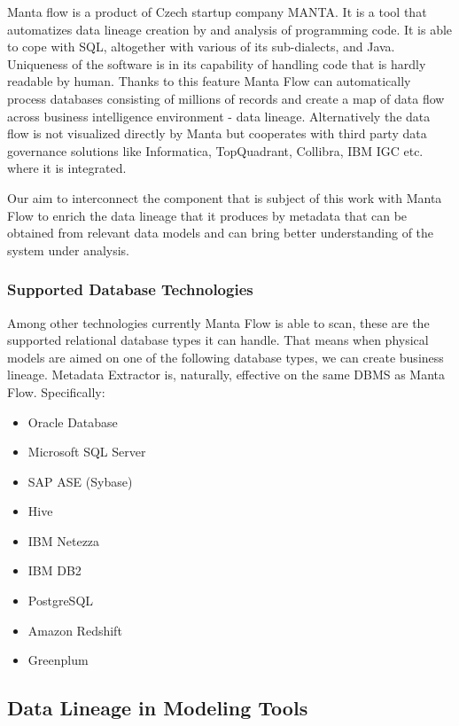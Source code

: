 Manta flow is a product of Czech startup company MANTA. It is a tool that automatizes data lineage creation by and analysis of programming code. It is able to cope with SQL, altogether with various of its sub-dialects, and Java. Uniqueness of the software is in its capability of handling code that is hardly readable by human. Thanks to this feature Manta Flow can automatically process databases consisting of millions of records and create a map of data flow across business intelligence environment - data lineage.
Alternatively the data flow is not visualized directly by Manta but cooperates with third party data governance solutions like Informatica, TopQuadrant, Collibra, IBM IGC etc. where it is integrated.

Our aim to interconnect the component that is subject of this work with Manta Flow to enrich the data lineage that it produces by metadata that can be obtained from relevant data models and can bring better understanding of the system under analysis.

\subsubsection{Supported Database Technologies}
Among other technologies currently Manta Flow is able to scan, these are the supported relational database types it can handle. 
That means when physical models are aimed on one of the following database types, we can create business lineage. Metadata Extractor is, naturally, effective on the same DBMS as Manta Flow. Specifically:
\begin{itemize}
	\item Oracle Database
	\item Microsoft SQL Server
	\item SAP ASE (Sybase)
	\item Hive
	\item IBM Netezza
	\item IBM DB2
	\item PostgreSQL
	\item Amazon Redshift
	\item Greenplum
\end{itemize}

\subsection{Data Lineage in Modeling Tools}

